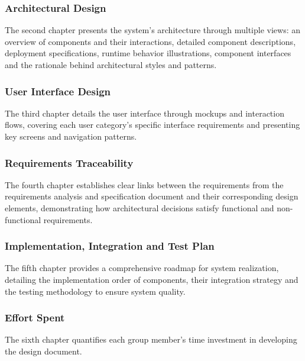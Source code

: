 \subsubsection{Architectural Design}
The second chapter presents the system's architecture through multiple views: an overview of components and their interactions, detailed component descriptions, deployment specifications, runtime behavior illustrations, component interfaces and the rationale behind architectural styles and patterns.

\subsubsection{User Interface Design}
The third chapter details the user interface through mockups and interaction flows, covering each user category's specific interface requirements and presenting key screens and navigation patterns.

\subsubsection{Requirements Traceability}
The fourth chapter establishes clear links between the requirements from the requirements analysis and specification document \cite{carraracurrodossi2024} and their corresponding design elements, demonstrating how architectural decisions satisfy functional and non-functional requirements.

\subsubsection{Implementation, Integration and Test Plan}
The fifth chapter provides a comprehensive roadmap for system realization, detailing the implementation order of components, their integration strategy and the testing methodology to ensure system quality.

\subsubsection{Effort Spent}
The sixth chapter quantifies each group member's time investment in developing the design document.
